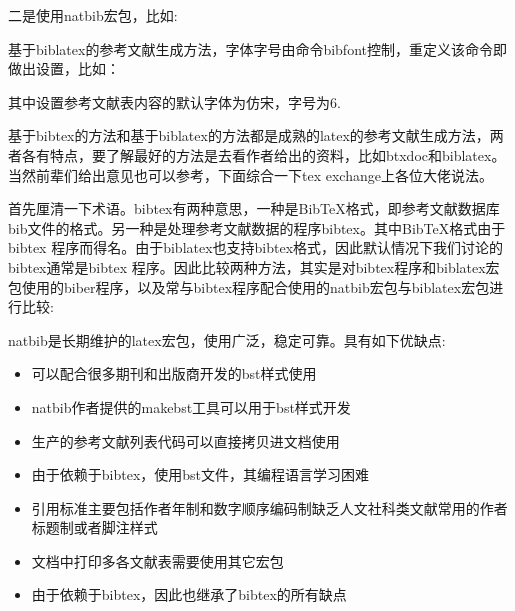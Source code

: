 二是使用natbib宏包，比如:

\begin{texlist}
\def\bibfont{\small}
\end{texlist}

基于biblatex的参考文献生成方法，字体字号由命令bibfont控制，重定义该命令即做出设置，比如：

\begin{texlist}
\renewcommand{\bibfont}{\fangsong\zihao{6}}
\end{texlist}

其中设置参考文献表内容的默认字体为仿宋，字号为6.




基于bibtex的方法和基于biblatex的方法都是成熟的latex的参考文献生成方法，两者各有特点，要了解最好的方法是去看作者给出的资料，比如btxdoc和biblatex。当然前辈们给出意见也可以参考，下面综合一下tex exchange上各位大佬说法。

首先厘清一下术语。bibtex有两种意思，一种是BibTeX格式，即参考文献数据库bib文件的格式。另一种是处理参考文献数据的程序bibtex。其中BibTeX格式由于bibtex 程序而得名。由于biblatex也支持bibtex格式，因此默认情况下我们讨论的bibtex通常是bibtex 程序。因此比较两种方法，其实是对bibtex程序和biblatex宏包使用的biber程序，以及常与bibtex程序配合使用的natbib宏包与biblatex宏包进行比较:


natbib是长期维护的latex宏包，使用广泛，稳定可靠。具有如下优缺点:
\begin{itemize}
  \item 可以配合很多期刊和出版商开发的bst样式使用

  \item natbib作者提供的makebst工具可以用于bst样式开发

  \item 生产的参考文献列表代码可以直接拷贝进文档使用

  \item 由于依赖于bibtex，使用bst文件，其编程语言学习困难

  \item 引用标准主要包括作者年制和数字顺序编码制缺乏人文社科类文献常用的作者标题制或者脚注样式

  \item 文档中打印多各文献表需要使用其它宏包

  \item 由于依赖于bibtex，因此也继承了bibtex的所有缺点
\end{itemize}


